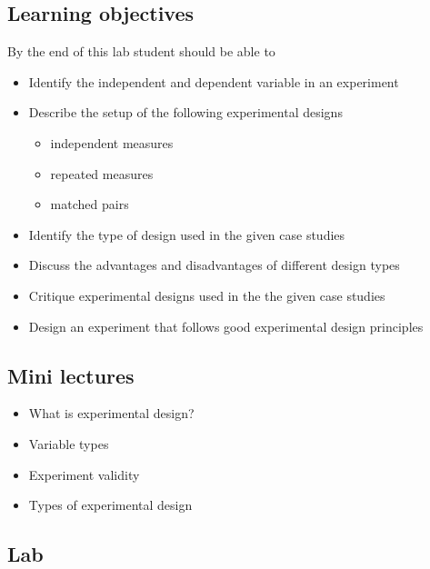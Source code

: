 \documentclass{article}
\begin{document}
\subsection*{Learning objectives}
By the end of this lab student should be able to
\begin{itemize}
  \item Identify the independent and dependent variable in an experiment
\item Describe the setup of the following experimental designs
  \begin{itemize}
  \item independent measures
  \item repeated measures
  \item matched pairs
  \end{itemize}
\item Identify the type of design used in the given case studies
\item Discuss the advantages and disadvantages of different design types
\item Critique experimental designs used in the the given case studies
\item Design an experiment that follows good experimental design principles
\end{itemize}

\subsection*{Mini lectures}

\begin{itemize}
\item What is experimental design?
\item Variable types
\item Experiment validity
\item Types of experimental design
\end{itemize}

\subsection*{Lab}
\end{document}
